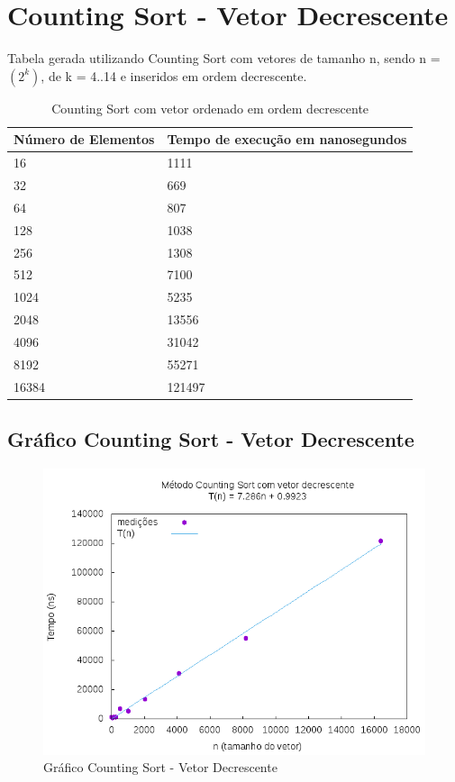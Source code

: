 \documentclass[12pt,a4paper,twoside]{report}
\begin{document}
\section{Counting Sort - Vetor Decrescente}
Tabela gerada utilizando Counting Sort com vetores de tamanho n, sendo n = $(2^k)$, de k = 4..14 e inseridos em ordem decrescente.
\begin{table}[H]
\centering
\caption{Counting Sort com vetor ordenado em ordem decrescente}
\label{my-label}
\begin{tabular}{|l|l|}
\hline
\multicolumn{1}{|c|}{\textbf{Número de Elementos}} & \multicolumn{1}{c|}{\textbf{Tempo de execução em nanosegundos}} \\ \hline
16 & 1111 \\ \hline
32 & 669 \\ \hline
64 & 807 \\ \hline
128 & 1038 \\ \hline
256 & 1308 \\ \hline
512 & 7100 \\ \hline
1024 & 5235 \\ \hline
2048 & 13556 \\ \hline
4096 & 31042 \\ \hline
8192 & 55271 \\ \hline
16384 & 121497 \\ \hline
\end{tabular}
\end{table}

\subsection{Gráfico Counting Sort - Vetor Decrescente}
\begin{figure}[H]
    \centering
    \includegraphics[width=0.7\linewidth]{graficos/CountingSort/vIntDecrescente/vIntDecrescente.png}
  \caption{Gráfico Counting Sort - Vetor Decrescente}
\end{figure}
\end{document}
